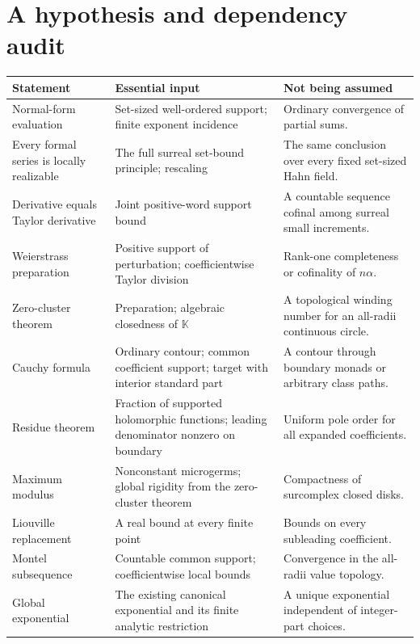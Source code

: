 \documentclass[11pt,oneside]{article}
\theoremstyle{definition}\newtheorem{definition}[theorem]{Definition}
\newcommand{\K}{\mathbb K}
\begin{document}
\section{A hypothesis and dependency audit}\label{app:audit}
\begin{longtable}{>{\raggedright\arraybackslash}p{}>{\raggedright\arraybackslash}p{}>{\raggedright\arraybackslash}p{}}
\toprule
Statement & Essential input & Not being assumed \\
\midrule\endhead
Normal-form evaluation & Set-sized well-ordered support; finite exponent incidence & Ordinary convergence of partial sums.\\
Every formal series is locally realizable & The full surreal set-bound principle; rescaling & The same conclusion over every fixed set-sized Hahn field.\\
Derivative equals Taylor derivative & Joint positive-word support bound & A countable sequence cofinal among surreal small increments.\\
Weierstrass preparation & Positive support of perturbation; coefficientwise Taylor division & Rank-one completeness or cofinality of $n\alpha$.\\
Zero-cluster theorem & Preparation; algebraic closedness of $\K$ & A topological winding number for an all-radii continuous circle.\\
Cauchy formula & Ordinary contour; common coefficient support; target with interior standard part & A contour through boundary monads or arbitrary class paths.\\
Residue theorem & Fraction of supported holomorphic functions; leading denominator nonzero on boundary & Uniform pole order for all expanded coefficients.\\
Maximum modulus & Nonconstant microgerms; global rigidity from the zero-cluster theorem & Compactness of surcomplex closed disks.\\
Liouville replacement & A real bound at every finite point & Bounds on every subleading coefficient.\\
Montel subsequence & Countable common support; coefficientwise local bounds & Convergence in the all-radii value topology.\\
Global exponential & The existing canonical exponential and its finite analytic restriction & A unique exponential independent of integer-part choices.\\
\bottomrule
\end{longtable}
\end{document}
